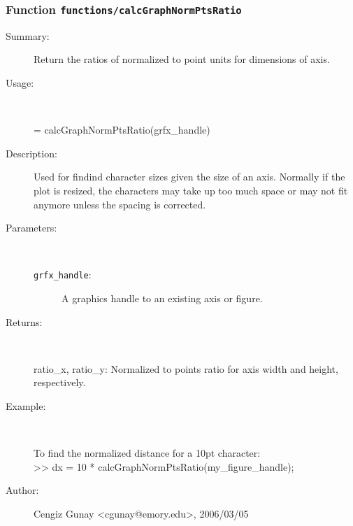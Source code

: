 \subsubsection[Function \texttt{calcGraphNormPtsRatio}]{Function \texttt{functions/calcGraphNormPtsRatio}}%
%
\label{ref_functions__calcGraphNormPtsRatio}%
\hypertarget{ref_functions__calcGraphNormPtsRatio}{}%
\begin{description}
\item[Summary:]Return the ratios of normalized to point units for dimensions of axis.
%
\item[Usage:]~%
\begin{lyxcode}%
[ratio\_x, ratio\_y] = calcGraphNormPtsRatio(grfx\_handle)
%
\end{lyxcode}%
%
\item[Description:]%
Used for findind character sizes given the size of an axis. Normally if the plot
 is resized, the characters may take up too much space or may not fit anymore unless
 the spacing is corrected.
\item[Parameters:]~
\begin{description}%
\item[\texttt{grfx\_handle}:]
 A graphics handle to an existing axis or figure.
\end{description}%
%
\item[Returns:]~

 	ratio\_x, ratio\_y: Normalized to points ratio for axis width and height, respectively.
%
\item[Example:]~
\begin{lyxcode} To find the normalized distance for a 10pt character:\\%
 >> dx = 10 * calcGraphNormPtsRatio(my\_figure\_handle);\\%
\end{lyxcode}
%
%
\item[Author:]%
Cengiz Gunay <cgunay@emory.edu>, 2006/03/05%
\end{description}
\methodline%

